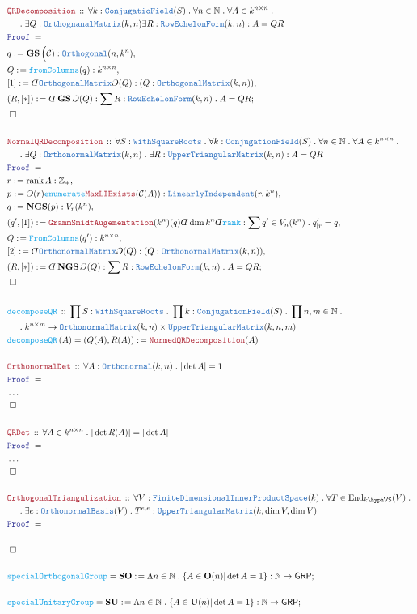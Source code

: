 \documentclass[12pt]{scrartcl}%
\newcommand{\TYPE}[1]{\textcolor{NavyBlue}{\mathtt{#1}}}%
\newcommand{\FUNC}[1]{\textcolor{Cerulean}{\mathtt{#1}}}%
\newcommand{\LOGIC}[1]{\textcolor{Blue}{\mathtt{#1}}}%
\newcommand{\THM}[1]{\textcolor{Maroon}{\mathtt{#1}}}%
\renewcommand{\.}{\; . \;} %
\newcommand{\de}{: \kern 0.1pc =} %
\newcommand{\Act}[1]{\left( #1 \right)} %
\newcommand{\Theorem}[2]{& \THM{#1} \, :: \, #2 \\ & \Proof = \\ } %
\newcommand{\DeclareFunc}[2]{& \FUNC{#1} \, :: \, #2 \\}%
\newcommand{\DefineNamedFunc}[4]{&  \FUNC{#1}\Act{#2} = #3 \de #4 \\}%
\newcommand{\NewLine}{\\ & \kern 1pc}%
\newcommand{\Page}[1]{ \begin{align*} #1 \end{align*}  }%
\newcommand{ \bd }{ \ByDef }%
\newcommand{\NoProof}{ & \ldots \\ \EndProof}%
\newcommand{\Int}{\mathbb{Z}}%
\newcommand{\Nat}{\mathbb{N}}%
\newcommand{\End}{\mathrm{End}}%
\newcommand{\Say}[3]{& #1 \de #2 : #3, \\} %
\newcommand{\Conclude}[3]{& #1 \de #2 : #3; \\}%
\newcommand{\QED}{\; \square} %
\newcommand{\EndProof}{& \QED \\} %
\newcommand{\ByDef}{\rotatebox[origin=c]{-180}{$D$}}%
\newcommand{\ByConstr}{\rotatebox[origin=c]{-180}{$C$}}%
\newcommand{\Proof}{\LOGIC{Proof} \; } %
\newcommand{\C}{\mathcal{C}}
\DeclareMathOperator{\rank}{rank} %
\newcommand{\GRP}{\mathsf{GRP}} %
\newcommand{\LI}{\TYPE{LinearlyIndependent}}
\newcommand{\UTM}{\TYPE{UpperTriangularMatrix}}
\newcommand{\SO}{\mathbf{SO}}
\newcommand{\SU}{\mathbf{SU}}
\newcommand{\OBasis}{\TYPE{OrthonormalBasis}}
\newcommand{\FDIPS}{\TYPE{FiniteDimensionalInnerProductSpace}}
\DeclareMathOperator{\GS}{\mathbf{GS}} %
\DeclareMathOperator{\NGS}{\mathbf{NGS}} %
\newcommand{\VS}[1]{#1\hyph\mathsf{VS}} %
\renewcommand{\O}{\mathbf{O}}
\newcommand{\U}{\mathbf{U}}
\begin{document}
\Page{
	\Theorem{QRDecomposition}{
		\forall k : \TYPE{ConjugatioField}(S) \. 
		\forall n \in \Nat \. 
		\forall A \in k^{n \times n} 
		 \. \NewLine \.
		\exists Q : \TYPE{OrthognanalMatrix}(k,n) 
		\exists R : \TYPE{RowEchelonForm}(k,n) : 
		A = QR
	}
	\Say{q}{\GS\Big(\C)}{\TYPE{Orthogonal}(n,k^n)}
	\Say{Q}{\FUNC{fromColumns}(q)}{k^{n\times n}}
	\Say{[1]}{\bd \TYPE{OrthogonalMatrix}\ByConstr(Q)}{ (Q : \TYPE{OrthogonalMatrix}(k,n))}
	\Conclude{(R,[*])}{\bd \GS \ByConstr(Q)}{\sum R : \TYPE{RowEchelonForm}(k,n) \. A = QR }
	\EndProof
	\\
	\Theorem{NormalQRDecomposition}{
		\forall S : \TYPE{WithSquareRoots} \.
		\forall k : \TYPE{ConjugationField}(S) \.
		\forall n \in \Nat \. 
		\forall A \in k^{n \times n} 
		\. \NewLine \.
		\exists Q : \TYPE{OrthonormalMatrix}(k,n)  \.
		\exists R : \UTM(k,n) :
		A = QR }
	\Say{r}{\rank A}{\Int_+}
	\Say{p}{\ByConstr(r)\FUNC{enumerate}\THM{MaxLIExists}(\C(A))}{ \LI(r,k^n)}
	\Say{q}{\NGS(p)}{ V_r(k^n)}
	\Say{(q',[1])}{\THM{GrammSmidtAugementation}(k^n)(q)\bd \dim k^n \bd \FUNC{rank}}{\sum q' \in V_n(k^n) \. q'_{|r} = q }
	\Say{Q}{\FUNC{FromColumns}(q')}{ k^{n \times n}}
	\Say{[2]}{\bd \TYPE{OrthonormalMatrix}\ByConstr(Q)}{ (Q : \TYPE{OrthonormalMatrix}(k,n))}
	\Conclude{(R,[*])}{\bd \NGS \ByConstr(Q)}{\sum R : \TYPE{RowEchelonForm}(k,n) \. A = QR }
	\EndProof
	\\
	\DeclareFunc{decomposeQR}{ \prod S : \TYPE{WithSquareRoots} \. \prod k : \TYPE{ConjugationField}(S) \.  \prod n,m \in \Nat \. \NewLine \. 
		k^{n \times m} \to \TYPE{OrthonormalMatrix}(k,n) \times \UTM(k,n,m)     }
	\DefineNamedFunc{decomposeQR}{A}{(Q(A),R(A))}{\THM{NormedQRDecomposition}(A)}
	\\
	\Theorem{OrthonormalDet}{\forall A : \TYPE{Orthonormal}(k,n) \. |\det A| = 1 }
	\NoProof
	\\
	\Theorem{QRDet}{\forall A \in k^{n \times n} \. |\det R(A)| = |\det A|}
	\NoProof
	\\
	\Theorem{OrthogonalTriangulization}{ 
		\forall  V : \FDIPS(k) \. 
		\forall T \in \End_{\VS{k}}(V) \. 
		\NewLine \. 
		\exists e : \OBasis(V) \. T^{e,e} : \UTM(k,\dim V,\dim V)   
	}
	\NoProof
	\\
	\Conclude{\FUNC{specialOrthogonalGroup} = \SO}{\Lambda n \in \Nat \. \{ A \in \O(n) | \det A = 1 \}}{\Nat \to \GRP  }
	\\
	\Conclude{\FUNC{specialUnitaryGroup} = \SU}{\Lambda n \in \Nat \. \{ A \in \U(n) | \det A = 1 \}}{\Nat \to \GRP}
}
\newpage
\end{document}
